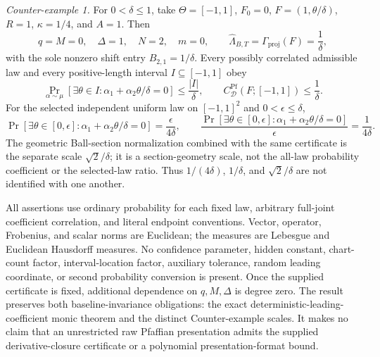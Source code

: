 \begin{theorem}
\emph{Counter-example 1.} For $0<\delta\leq1$, take $\Theta=[-1,1]$, $F_0=0$,
$F=(1,\theta/\delta)$, $R=1$, $\kappa=1/4$, and $A=1$. Then
\begin{equation}
\label{eq:main-display-015}
q=M=0,\quad \Delta=1,\quad N=2,\quad m=0,
\qquad \widehat\Lambda_{B,T}=\Gamma_{\mathrm{proj}}(F)=\frac1\delta,
\end{equation}
with the sole nonzero shift entry $B_{2,1}=1/\delta$. Every possibly correlated admissible law and every
positive-length interval $I\subseteq[-1,1]$ obey
\begin{equation}
\label{eq:main-display-016}
\Pr_{\alpha\sim\mu}[\exists\theta\in I:\alpha_1+\alpha_2\theta/\delta=0]\leq\frac{|I|}{\delta},
\qquad C^{\mathrm{Pf}}_{\mathcal D}(F;[-1,1])\leq\frac1\delta.
\end{equation}
For the selected independent uniform law on $[-1,1]^2$ and $0<\epsilon\leq\delta$,
\begin{equation}
\label{eq:main-display-017}
\Pr[\exists\theta\in[0,\epsilon]:\alpha_1+\alpha_2\theta/\delta=0]
=\frac{\epsilon}{4\delta},\qquad
\frac{\Pr[\exists\theta\in[0,\epsilon]:\alpha_1+\alpha_2\theta/\delta=0]}{\epsilon}
=\frac1{4\delta}.
\end{equation}
The geometric Ball-section normalization combined with the same certificate is the separate scale
$\sqrt2/\delta$; it is a section-geometry scale, not the all-law probability coefficient or the selected-law
ratio. Thus $1/(4\delta)$, $1/\delta$, and $\sqrt2/\delta$ are not identified with one another.

All assertions use ordinary probability for each fixed law, arbitrary full-joint coefficient correlation,
and literal endpoint conventions. Vector, operator, Frobenius, and scalar norms are Euclidean; the measures
are Lebesgue and Euclidean Hausdorff measures. No confidence parameter, hidden constant, chart-count factor,
interval-location factor, auxiliary tolerance, random leading coordinate, or second probability conversion is
present. Once the supplied certificate is fixed, additional dependence on $q,M,\Delta$ is degree zero. The result preserves both
baseline-invariance obligations: the exact deterministic-leading-coefficient monic theorem and the distinct
Counter-example scales. It makes no claim that an unrestricted raw Pfaffian presentation admits the supplied
derivative-closure certificate or a polynomial presentation-format bound.
\end{theorem}
